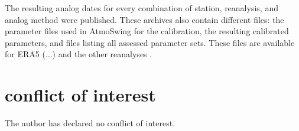 \documentclass[alpha-refs]{wiley-article}
\begin{document}
The resulting analog dates for every combination of station, reanalysis, and analog method were published. These archives also contain different files: the parameter files used in AtmoSwing for the calibration, the resulting calibrated parameters, and files listing all assessed parameter sets. These files are available for ERA5 (...) and the other reanalyses \citep[see references in][]{Horton2018b}.



\section*{conflict of interest}
The author has declared no conflict of interest.










\end{document}
